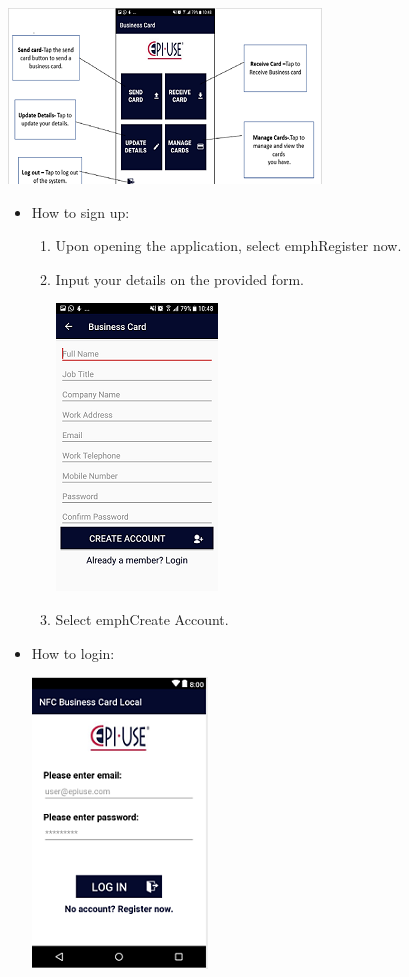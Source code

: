 \documentclass[english]{article}
\begin{document}
			\includegraphics{Main.png}
	\begin{itemize}	
		\item How to sign up:
		
		
		\begin{enumerate}
			\item Upon opening the application, select emph{Register now}.
			\item Input your details on the provided form.
			

			\includegraphics{Sign_up.png}
		
			\item Select emph{Create Account}.
			 
		\end{enumerate}

		\end{itemize}
		\begin{itemize}
		\item How to login:
		

			\includegraphics {Login.png}

		\end{itemize}
\end{document}
